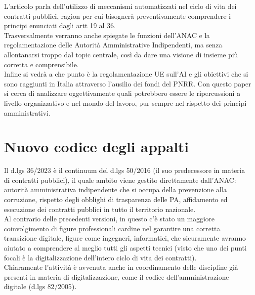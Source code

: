 \documentclass{article}
\begin{document}
\begin{justify}
L'articolo parla dell'utilizzo di meccanismi automatizzati nel ciclo di vita dei contratti pubblici, ragion per cui bisognerà preventivamente comprendere i principi enunciati dagli artt 19 al 36.\\
Trasversalmente verranno anche spiegate le funzioni dell'ANAC e la regolamentazione delle Autorità Amministrative Indipendenti, ma senza allontanarsi troppo dal topic centrale, così da dare una visione di insieme più corretta e comprensibile.\\
Infine si vedrà a che punto è la regolamentazione UE sull'AI e gli obiettivi che si sono raggiunti in Italia attraverso l'ausilio dei fondi del PNRR.
Con questo paper si cerca di analizzare oggettivamente quali potrebbero essere le ripercussioni a livello organizzativo e nel mondo del lavoro, pur sempre nel rispetto dei principi amministrativi.
\end{justify}

\centering
\section{Nuovo codice degli appalti}
\begin{justify}
    Il d.lgs 36/2023 è il continuum del d.lgs 50/2016 (il suo predecessore in materia di contratti pubblici), il quale ambito viene gestito direttamente dall'ANAC: autorità amministrativa indipendente che si occupa della prevenzione alla corruzione, rispetto degli obblighi di trasparenza delle PA, affidamento ed esecuzione dei contratti pubblici in tutto il territorio nazionale.\citep{AnacSite}\\
    Al contrario delle precedenti versioni, in questo c'è stato un maggiore coinvolgimento di figure professionali cardine nel garantire una corretta transizione digitale, figure come ingegneri, informatici, che sicuramente avranno aiutato a comprendere al meglio tutti gli aspetti tecnici (visto che uno dei punti focali è la digitalizzazione dell'intero ciclo di vita dei contratti).\\
    Chiaramente l'attività è avvenuta anche in coordinamento delle discipline già presenti in materia di digitalizzazione, come il codice dell'amministrazione digitale (d.lgs 82/2005).
\end{justify}
\end{document}
